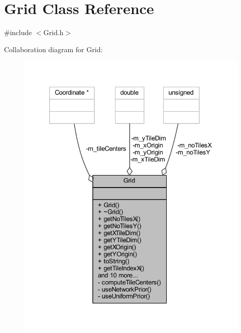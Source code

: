 \hypertarget{class_grid}{}\section{Grid Class Reference}
\label{class_grid}


{\ttfamily \#include $<$Grid.\+h$>$}



Collaboration diagram for Grid\+:\nopagebreak
\begin{figure}[H]
\begin{center}
\leavevmode
\includegraphics[width=333pt]{class_grid__coll__graph}
\end{center}
\end{figure}
